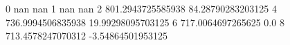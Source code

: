 0 nan nan
1 nan nan
2 801.2943725585938 84.28790283203125
4 736.9994506835938 19.99298095703125
6 717.0064697265625 0.0
8 713.4578247070312 -3.54864501953125
